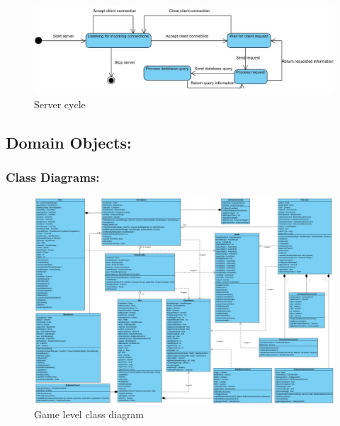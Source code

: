 \documentclass[letterpaper]{article}
\begin{document}
					\begin{figure}[H]
					\centering
					\includegraphics[width=180mm]{UML_Diagram/State/Server_State_Diagram.jpg}
					\caption{Server cycle}
					\label{overflow}
					\end{figure}
			
			\vspace{0.2in}
			\subsection*{Domain Objects:}
			\vspace{0.1in}
			
				\vspace{0.2in}
				\subsubsection*{Class Diagrams:}
				\vspace{0.1in}
				
					\begin{figure}[H]
					\centering
					\includegraphics[width=180mm]{UML_Diagram/Class/Game_Classes.jpg}
					\caption{Game level class diagram}
					\label{overflow}
					\end{figure}
					
\end{document}
